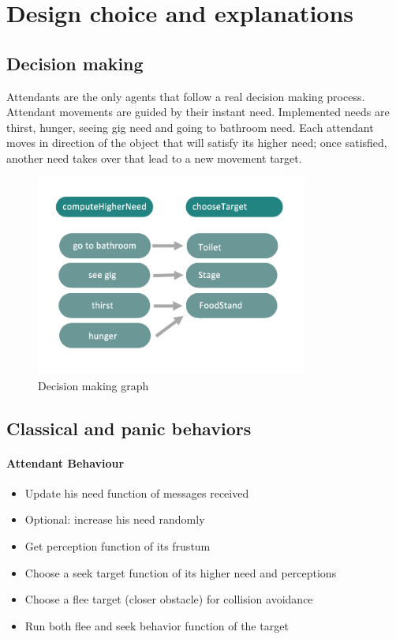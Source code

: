 \newpage

\section{Design choice and explanations}

\subsection{Decision making}

Attendants are the only agents that follow a real decision making process.
Attendant movements are guided by their instant need. Implemented needs are thirst, hunger, seeing gig need and going to bathroom need. Each attendant moves in direction of the object that will satisfy its higher need; once satisfied, another need takes over that lead to a new movement target.

\begin{figure}[h]
	\begin{center}
		\includegraphics[width=0.8\textwidth]{img/decisionmaking.png}
	\end{center}
	\caption{Decision making graph}
\end{figure}

\newpage

\subsection{Classical and panic behaviors}

\paragraph{Attendant Behaviour}

\begin{itemize}
	\item Update his need function of messages received
	\item Optional: increase his need randomly
	\item Get perception function of its frustum
	\item Choose a seek target function of its higher need and perceptions
	\item Choose a flee target (closer obstacle) for collision avoidance
	\item Run both flee and seek behavior function of the target
\end{itemize}


